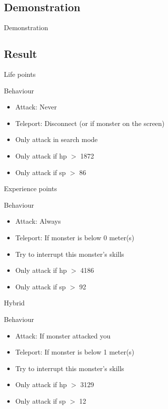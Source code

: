 \subsection{Demonstration}

\begin{frame}{Demonstration}
  \\
\end{frame}

\subsection{Result}

\begin{frame}{Life points}
  \begin{block}{Behaviour}
    \begin{itemize}
    \item Attack: Never
    \item Teleport: Disconnect (or if monster on the screen)
    \item Only attack in search mode
    \item Only attack if hp $>$ 1872
    \item Only attack if sp $>$ 86
    \end{itemize}
  \end{block}
\end{frame}

\begin{frame}{Experience points}
  \begin{block}{Behaviour}
    \begin{itemize}
    \item Attack: Always
    \item Teleport: If monster is below 0 meter(s)
    \item Try to interrupt this monster's skills
    \item Only attack if hp $>$ 4186
    \item Only attack if sp $>$ 92
    \end{itemize}
  \end{block}
\end{frame}

\begin{frame}{Hybrid}
  \begin{block}{Behaviour}
    \begin{itemize}
    \item Attack: If monster attacked you
    \item Teleport: If monster is below 1 meter(s)
    \item Try to interrupt this monster's skills
    \item Only attack if hp $>$ 3129
    \item Only attack if sp $>$ 12
    \end{itemize}
  \end{block}
\end{frame}
